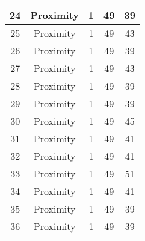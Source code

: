 \documentclass[results.tex]{subfiles}
\begin{document}
\begin{center}
\begin{tabular}{| c || c | c | c | c |}
            \hline
            24                      & Proximity                    & 1                      & 49                      & 39                   \\
            \hline
            25                      & Proximity                    & 1                      & 49                      & 43                   \\
            \hline
            26                      & Proximity                    & 1                      & 49                      & 39                   \\
            \hline
            27                      & Proximity                    & 1                      & 49                      & 43                   \\
            \hline
            28                      & Proximity                    & 1                      & 49                      & 39                   \\
            \hline
            29                      & Proximity                    & 1                      & 49                      & 39                   \\
            \hline
            30                      & Proximity                    & 1                      & 49                      & 45                   \\
            \hline
            31                      & Proximity                    & 1                      & 49                      & 41                   \\
            \hline
            32                      & Proximity                    & 1                      & 49                      & 41                   \\
            \hline
            33                      & Proximity                    & 1                      & 49                      & 51                   \\
            \hline
            34                      & Proximity                    & 1                      & 49                      & 41                   \\
            \hline
            35                      & Proximity                    & 1                      & 49                      & 39                   \\
            \hline
            36                      & Proximity                    & 1                      & 49                      & 39                   \\

\end{tabular}
\end{center}
\end{document}
